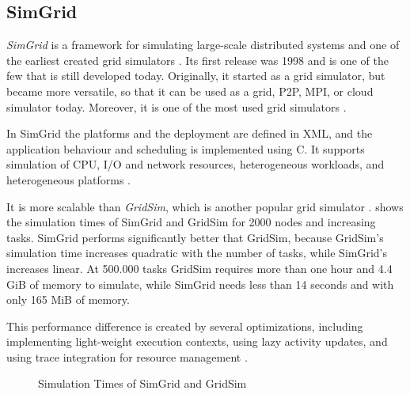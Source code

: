 \subsection{SimGrid}
\label{simgrid}
\textit{SimGrid} is a framework for simulating large-scale distributed systems and one of the earliest created grid simulators \cite{simgrid_update}. Its first release was 1998 and is one of the few that is still developed today. Originally, it started as a grid simulator, but became more versatile, so that it can be used as a grid, P2P, MPI, or cloud simulator today. Moreover, it is one of the most used grid simulators \cite{simgrid_update}.

In SimGrid the platforms and the deployment are defined in XML, and the application behaviour and scheduling is implemented using C. It supports simulation of CPU, I/O and network resources, heterogeneous workloads, and heterogeneous platforms \cite{simgrid_update}.

It is more scalable than \textit{GridSim}, which is another popular grid simulator \cite{simgrid_update}.
 shows the simulation times of SimGrid and GridSim for 2000 nodes and increasing tasks.
SimGrid performs significantly better that GridSim, because GridSim's simulation time increases quadratic with the number of tasks, while SimGrid's increases linear. At 500.000 tasks GridSim requires more than one hour and 4.4 GiB of memory to simulate, while SimGrid needs less than 14 seconds and with only 165 MiB of memory.

This performance difference is created by several optimizations, including implementing light-weight execution contexts, using lazy activity updates, and using trace integration for resource management \cite{simgrid_update}.
\newpage

\begin{figure}
\begin{center}
\caption{Simulation Times of SimGrid and GridSim \cite{simgrid_update}}
\label{diag}
\end{center}
\end{figure}

